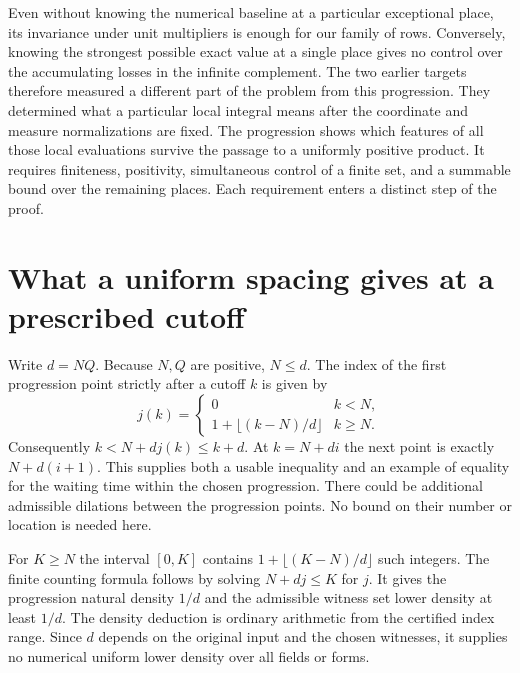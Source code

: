 \documentclass[12pt,letterpaper]{article}
\begin{document}
Even without knowing the numerical baseline at a particular exceptional place, its invariance under unit multipliers is enough for our family of rows. Conversely, knowing the strongest possible exact value at a single place gives no control over the accumulating losses in the infinite complement. The two earlier targets therefore measured a different part of the problem from this progression. They determined what a particular local integral means after the coordinate and measure normalizations are fixed. The progression shows which features of all those local evaluations survive the passage to a uniformly positive product. It requires finiteness, positivity, simultaneous control of a finite set, and a summable bound over the remaining places. Each requirement enters a distinct step of the proof.

\section{What a uniform spacing gives at a prescribed cutoff}
Write $d=NQ$. Because $N,Q$ are positive, $N\le d$. The index of the first progression point strictly after a cutoff $k$ is given by
\[
 j(k)=\begin{cases}0& k<N,\\1+\lfloor(k-N)/d\rfloor&k\ge N.\end{cases}
\]
Consequently $k<N+dj(k)\le k+d$. At $k=N+di$ the next point is exactly $N+d(i+1)$. This supplies both a usable inequality and an example of equality for the waiting time within the chosen progression. There could be additional admissible dilations between the progression points. No bound on their number or location is needed here.

For $K\ge N$ the interval $[0,K]$ contains $1+\lfloor(K-N)/d\rfloor$ such integers. The finite counting formula follows by solving $N+dj\le K$ for $j$. It gives the progression natural density $1/d$ and the admissible witness set lower density at least $1/d$. The density deduction is ordinary arithmetic from the certified index range. Since $d$ depends on the original input and the chosen witnesses, it supplies no numerical uniform lower density over all fields or forms.
\end{document}
